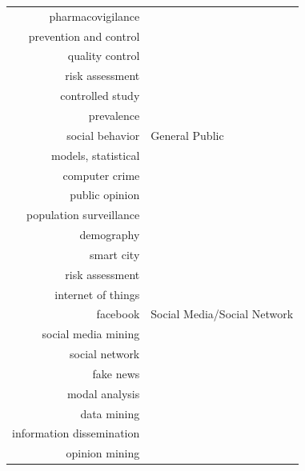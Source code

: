 \begin{center}
\begin{longtable}{rl}
        pharmacovigilance               &                              \\
        prevention and control          &                              \\
        quality control                 &                              \\
        risk assessment                 &                              \\
        controlled study                &                              \\
        prevalence                      &                              \\
        social behavior                 & General Public               \\
        models, statistical             &                              \\
        computer crime                  &                              \\
        public opinion                  &                              \\
        population surveillance         &                              \\
        demography                      &                              \\
        smart city                      &                              \\
        risk assessment                 &                              \\
        internet of things              &                              \\
        facebook                        & Social Media/Social Network  \\
        social media mining             &                              \\
        social network                  &                              \\
        fake news                       &                              \\
        modal analysis                  &                              \\
        data mining                     &                              \\
        information dissemination       &                              \\
        opinion mining                  &                              \\

\end{longtable}
\end{center}
